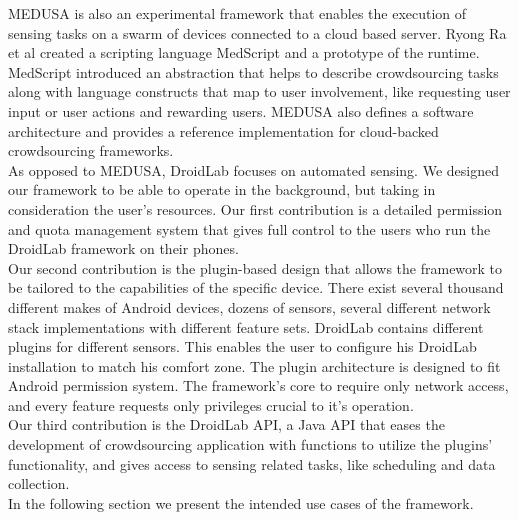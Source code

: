 \documentclass[conference,letterpaper]{IEEEtran}
\begin{document}
\indent MEDUSA \cite{Ra} is also an experimental framework that enables the execution of sensing tasks on a swarm of devices connected to a cloud based server. Ryong Ra et al created a scripting language MedScript and a prototype of the runtime. MedScript introduced an abstraction that helps to describe crowdsourcing tasks along with language constructs that map to user involvement, like requesting user input or user actions and rewarding users. MEDUSA also defines a software architecture and provides a reference implementation for cloud-backed crowdsourcing frameworks.\\
\indent As opposed to MEDUSA, DroidLab focuses on automated sensing. We designed our framework to be able to operate in the background, but taking in consideration the user's resources. Our first contribution is a detailed permission and quota management system that gives full control to the users who run the DroidLab framework on their phones.\\
\indent Our second contribution is the plugin-based design that allows the framework to be tailored to the capabilities of the specific device. There exist several thousand different makes of Android devices, dozens of sensors, several different network stack implementations with different feature sets. DroidLab contains different plugins for different sensors. This enables the user to configure his DroidLab installation to match his comfort zone. The plugin architecture is designed to fit Android permission system. The framework's core to require only network access, and every feature requests only privileges crucial to it's operation.\\
\indent Our third contribution is the DroidLab API, a Java API that eases the development of crowdsourcing application with functions to utilize the plugins' functionality, and gives access to sensing related tasks, like scheduling and data collection.\\
\indent In the following section we present the intended use cases of the framework.
\end{document}
